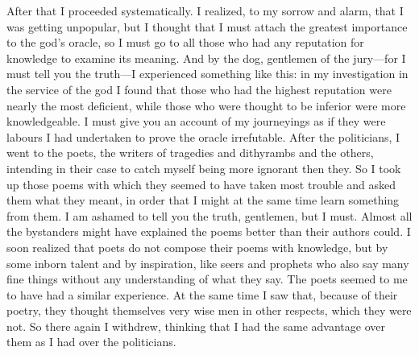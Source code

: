 After that I proceeded systematically. I realized, to my sorrow and alarm, that I was getting
unpopular, but I thought that I must attach the greatest importance to the god's oracle, so I must
go to all those who had any reputation for knowledge to examine its meaning. And by the dog,
gentlemen of the jury—for I must tell you the truth—I experienced something like this: in my
investigation in the service of the god I found that those who had the highest reputation were
nearly the most deficient, while those who were thought to be inferior were more knowledgeable.
I must give you an account of my journeyings as if they were labours I had undertaken to prove
the oracle irrefutable. After the politicians, I went to the poets, the writers of tragedies and
dithyrambs and the others, intending in their case to catch myself being more ignorant then they.
So I took up those poems with which they seemed to have taken most trouble and asked them what
they meant, in order that I might at the same time learn something from them. I am ashamed to tell
you the truth, gentlemen, but I must. Almost all the bystanders might have explained the poems
better than their authors could. I soon realized that poets do not compose their poems with
knowledge, but by some inborn talent and by inspiration, like seers and prophets who also say
many fine things without any understanding of what they say. The poets seemed to me to have had
a similar experience. At the same time I saw that, because of their poetry, they thought themselves
very wise men in other respects, which they were not. So there again I withdrew, thinking that I
had the same advantage over them as I had over the politicians.

